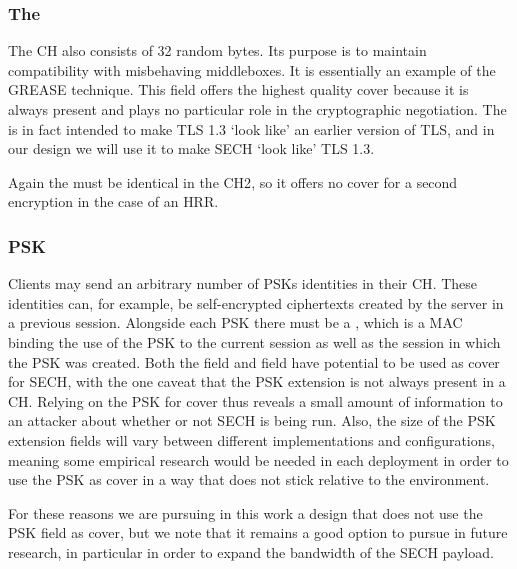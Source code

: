 \subsubsection{The }
The \ac{CH} also consists of 32 random bytes.
Its purpose
is to maintain compatibility with misbehaving
middleboxes.
It is essentially an example of the \ac{GREASE}
technique.
This field offers the highest quality cover because it is always present and plays no particular
role in the cryptographic negotiation.
The  is in fact intended to make \ac{TLS} 1.3 `look like' an earlier version of \ac{TLS},
and in our design we will use it to make \ac{SECH} `look like' \ac{TLS} 1.3.

Again the \varlegacysessionid{}
must be identical in the \ac{CH2},
so it offers no cover for a second encryption in the case of an \ac{HRR}.

\subsubsection{PSK}
Clients may send an arbitrary number of \acp{PSK}
identities in their \ac{CH}.
These identities can, for example, be self-encrypted ciphertexts created by the server
in a previous session.
Alongside each \ac{PSK} there must be a ,
which is a \ac{MAC} binding the use of the \ac{PSK} to the current session as well
as the session in which the \ac{PSK} was created.
Both the   field and  field
have potential to be used as cover for \ac{SECH},
with the one caveat that the \ac{PSK} extension is not always present
in a \ac{CH}.
Relying on the \ac{PSK} for cover thus reveals a small amount of information
to an attacker about whether or not \ac{SECH} is being run.
Also, the size of the \ac{PSK} extension fields will vary between different
implementations and configurations,
meaning some empirical research would be needed in each deployment
in order to use the \ac{PSK} as cover in a way that does not stick relative
to the environment.

For these reasons we are pursuing in this work a design that does not use
the \ac{PSK} field as cover,
but we note that it remains a good option to pursue in future research,
in particular in order to expand the bandwidth of the \ac{SECH} payload.
